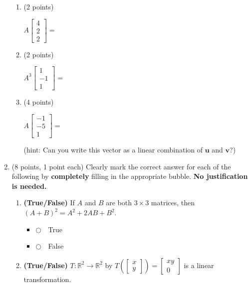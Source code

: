 \documentclass[12pt]{extarticle}
\newcommand{\chooseone}{{\Large$\Circle$\ \ }}
\begin{document}
\begin{enumerate}
\begin{enumerate}[label=\alph*.]
\item (2 points) 
\medskip

$A\begin{bmatrix} 4 \\ 2 \\ 2\end{bmatrix}=$

\vspace{1in}

\item (2 points) 
\medskip

$A^3\begin{bmatrix} 1\\ -1 \\ 1\end{bmatrix}=$

\vspace{1in}

\item (4 points) 
\medskip

$A\begin{bmatrix} -1\\ -5 \\ 1\end{bmatrix}=$

\vspace{0.25in}

(hint: Can you write this vector as a linear combination of $\mathbf{u}$ and $\mathbf{v}$?)
\vspace{1in}
\end{enumerate}

\newpage




  \item (8 points, 1 point each)  Clearly mark the correct answer for each of the following by \textbf{completely} filling in the appropriate bubble.  \textbf{No justification is needed.}
\begin{enumerate}[label=\alph*.]
\item \textbf{(True/False)} If $A$ and $B$ are both $3\times 3$ matrices, then $(A+B)^2=A^2+2AB+B^2$. %
\begin{itemize}[label={}]
\item \chooseone True
\item \chooseone False
\end{itemize}

\vspace{2cm}
\item \textbf{(True/False)} $T:\mathbb{R}^2\to \mathbb{R}^2$ by $T\left(\begin{bmatrix} x\\ y\end{bmatrix}\right)=\begin{bmatrix} xy \\ 0\end{bmatrix}$ is a linear transformation.


\end{enumerate}
\end{enumerate}
\end{document}
